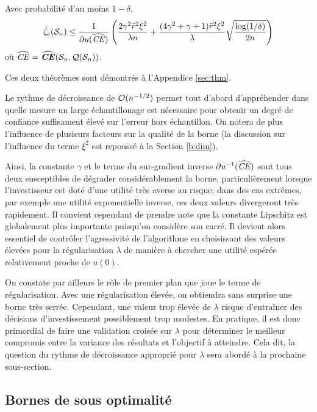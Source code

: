 \begin{thm}
  \label{thm2}
  Avec probabilité d'au moins $1-\delta$,
  \begin{equation}
    \hat\zeta_e(\mathcal S_n) \leq \frac{1}{\partial u(\operatorname{\widehat{\operatorname{\mbox{\textit{CE}}}}})}\left( \frac{2\gamma^2\bar r^2\xi^2}{\lambda n} + \frac{(4\gamma^2 + \gamma +
        1)\bar r^2\xi^2}{\lambda}\sqrt{\frac{\log(1/\delta)}{2n}}\right) 
  \end{equation}
  où $\operatorname{\widehat{\operatorname{\mbox{\textit{CE}}}}} = \operatorname{\widehat{\operatorname{\mbox{\textbf{\textit{CE}}}}}}(\mathcal S_n,\mathcal{Q}(\mathcal S_n))$. 
\end{thm}

Ces deux théorèmes sont démontrés à l'Appendice \ref{sec:thm}.

Le rythme de décroissance de $\mathcal O(n^{-1/2})$ permet tout d'abord d'appréhender dans
quelle mesure un large échantillonage est nécessaire pour obtenir un degré de confiance
suffisament élevé sur l'erreur hors échantillon. On notera de plus l'influence de
plusieurs facteurs sur la qualité de la borne (la discussion sur l'influence du terme
$\xi^2$ est repoussé à la Section \ref{b:dim}).

Ainsi, la constante $\gamma$ et le terme du sur-gradient inverse $\partial u^{-1}(\operatorname{\widehat{\operatorname{\mbox{\textit{CE}}}}})$ sont tous
deux susceptibles de dégrader considérablement la borne, particulièrement lorsque
l'investisseur est doté d'une utilité très averse au risque; dans des cas extrêmes, par
exemple une utilité exponentielle inverse, ces deux valeurs divergeront très
rapidement. Il convient cependant de prendre note que la constante Lipschitz est
globalement plus importante puisqu'on considère son carré. Il devient alors essentiel de
contrôler l'agressivité de l'algorithme en choisissant des valeurs élevées pour la
régularisation $\lambda$ de manière à chercher une utilité espérée relativement proche de
$u(0)$.

On constate par ailleurs le rôle de premier plan que joue le terme de régularisation. Avec
une régularisation élevée, on obtiendra sans surprise une borne très serrée. Cependant,
une valeur trop élevée de $\lambda$ risque d'entraîner des décisions d'investissement
possiblement trop modestes. En pratique, il est donc primordial
de faire une validation croisée sur $\lambda$ pour déterminer le meilleur compromis entre la
variance des résultats et l'objectif à atteindre. Cela dit, la question du rythme de
décroissance approprié pour $\lambda$ sera abordé à la prochaine sous-section.


\subsection{Bornes de sous optimalité}
\label{b:sopt}


